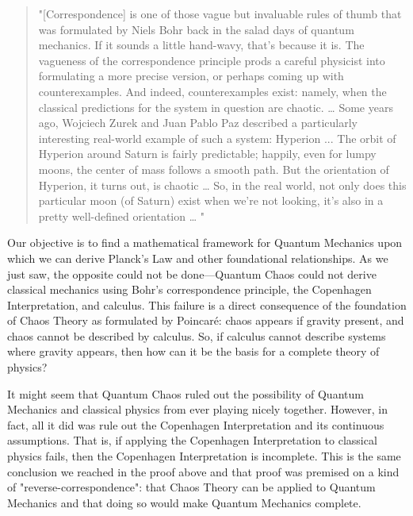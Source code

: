 \documentclass{article}
\begin{document}
\begin{quotation}
    "[Correspondence] is one of those vague but invaluable rules of thumb that was formulated by Niels Bohr back in the salad days of quantum mechanics. If it sounds a little hand-wavy, that’s because it is.
    \newline
    \newline
    The vagueness of the correspondence principle prods a careful physicist into formulating a more precise version, or perhaps coming up with counterexamples. And indeed, counterexamples exist: namely, when the classical predictions for the system in question are chaotic. \dots
    \newline
    \newline
    Some years ago, Wojciech Zurek and Juan Pablo Paz described a particularly interesting real-world example of such a system: Hyperion ... The orbit of Hyperion around Saturn is fairly predictable; happily, even for lumpy moons, the center of mass follows a smooth path. But the orientation of Hyperion, it turns out, is chaotic \dots
    \newline
    \newline
    So, in the real world, not only does this particular moon (of Saturn) exist when we’re not looking, it’s also in a pretty well-defined orientation \dots
    "\cite{CarrollHyperion}
\end{quotation}

Our objective is to find a mathematical framework for Quantum Mechanics upon which we can derive Planck's Law and other foundational relationships. As we just saw, the opposite could not be done—Quantum Chaos could not derive classical mechanics using Bohr's correspondence principle, the Copenhagen Interpretation, and calculus. This failure is a direct consequence of the foundation of Chaos Theory as formulated by Poincar\'e: chaos appears if gravity present, and chaos cannot be described by calculus. So, if calculus cannot describe systems where gravity appears, then how can it be the basis for a complete theory of physics?

It might seem that Quantum Chaos ruled out the possibility of Quantum Mechanics and classical physics from ever playing nicely together. However, in fact, all it did was rule out the Copenhagen Interpretation and its continuous assumptions. That is, if applying the Copenhagen Interpretation to classical physics fails, then the Copenhagen Interpretation is incomplete. This is the same conclusion we reached in the proof above and that proof was premised on a kind of "reverse-correspondence": that Chaos Theory can be applied to Quantum Mechanics and that doing so would make Quantum Mechanics complete.
\end{document}
